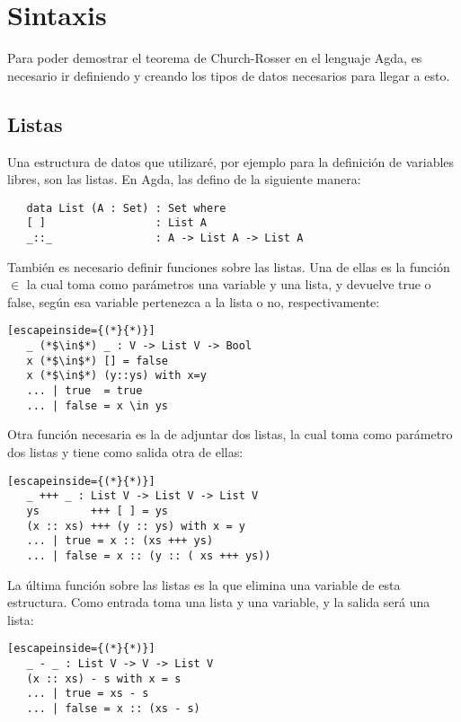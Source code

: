 \chapter{Sintaxis}
\label{chap:syntax}

Para poder demostrar el teorema de Church-Rosser en el lenguaje Agda, es necesario ir definiendo y creando los tipos de datos necesarios para llegar a esto.

\section{Listas}

Una estructura de datos que utilizaré, por ejemplo para la definición de variables libres, son las listas. En Agda, las defino de la siguiente manera:

\begin{lstlisting}
   data List (A : Set) : Set where
   [ ]                 : List A
   _::_                : A -> List A -> List A
\end{lstlisting}

También es necesario definir funciones sobre las listas. Una de ellas es la función $\in$ la cual toma como parámetros una variable y una lista, y devuelve true o false, según esa variable pertenezca a la lista o no, respectivamente:

\begin{lstlisting}[escapeinside={(*}{*)}]
   _ (*$\in$*) _ : V -> List V -> Bool
   x (*$\in$*) [] = false
   x (*$\in$*) (y::ys) with x=y
   ... | true  = true
   ... | false = x \in ys
\end{lstlisting}

Otra función necesaria es la de adjuntar dos listas, la cual toma como parámetro dos listas y tiene como salida otra de ellas:

\begin{lstlisting}[escapeinside={(*}{*)}]
   _ +++ _ : List V -> List V -> List V
   ys        +++ [ ] = ys
   (x :: xs) +++ (y :: ys) with x = y
   ... | true = x :: (xs +++ ys)
   ... | false = x :: (y :: ( xs +++ ys))
 \end{lstlisting}

La última función sobre las listas es la que elimina una variable de esta estructura. Como entrada toma una lista y una variable, y la salida será una lista:

\begin{lstlisting}[escapeinside={(*}{*)}]
   _ - _ : List V -> V -> List V
   (x :: xs) - s with x = s
   ... | true = xs - s
   ... | false = x :: (xs - s)
\end{lstlisting}

